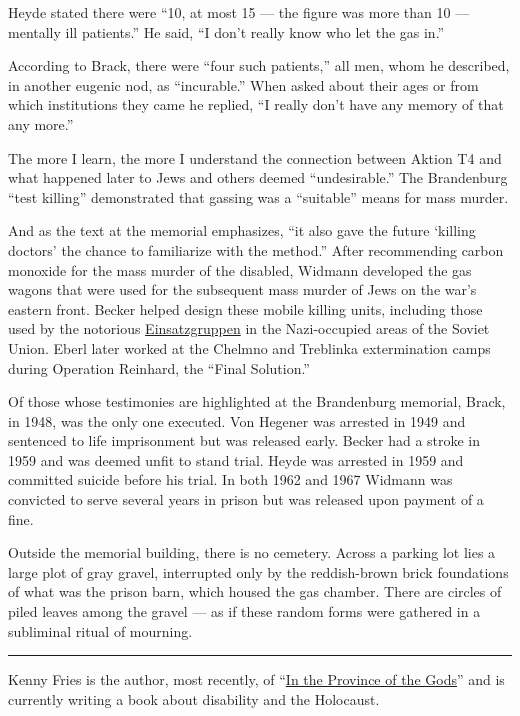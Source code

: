 Heyde stated there were ``10, at most 15 --- the figure was more than 10
--- mentally ill patients.'' He said, ``I don't really know who let the
gas in.''

According to Brack, there were ``four such patients,'' all men, whom he
described, in another eugenic nod, as ``incurable.'' When asked about
their ages or from which institutions they came he replied, ``I really
don't have any memory of that any more.''

The more I learn, the more I understand the connection between Aktion T4
and what happened later to Jews and others deemed ``undesirable.'' The
Brandenburg ``test killing'' demonstrated that gassing was a
``suitable'' means for mass murder.

And as the text at the memorial emphasizes, ``it also gave the future
`killing doctors' the chance to familiarize with the method.'' After
recommending carbon monoxide for the mass murder of the disabled,
Widmann developed the gas wagons that were used for the subsequent mass
murder of Jews on the war's eastern front. Becker helped design these
mobile killing units, including those used by the notorious
\href{https://www.nytimes.com/2002/06/30/books/himmler-s-willing-executioners.html}{Einsatzgruppen}
in the Nazi-occupied areas of the Soviet Union. Eberl later worked at
the Chelmno and Treblinka extermination camps during Operation Reinhard,
the ``Final Solution.''

Of those whose testimonies are highlighted at the Brandenburg memorial,
Brack, in 1948, was the only one executed. Von Hegener was arrested in
1949 and sentenced to life imprisonment but was released early. Becker
had a stroke in 1959 and was deemed unfit to stand trial. Heyde was
arrested in 1959 and committed suicide before his trial. In both 1962
and 1967 Widmann was convicted to serve several years in prison but was
released upon payment of a fine.

Outside the memorial building, there is no cemetery. Across a parking
lot lies a large plot of gray gravel, interrupted only by the
reddish-brown brick foundations of what was the prison barn, which
housed the gas chamber. There are circles of piled leaves among the
gravel --- as if these random forms were gathered in a subliminal ritual
of mourning.

\begin{center}\rule{0.5\linewidth}{\linethickness}\end{center}

Kenny Fries is the author, most recently, of
``\href{https://www.kennyfries.com/works}{In the Province of the Gods}''
and is currently writing a book about disability and the Holocaust.

